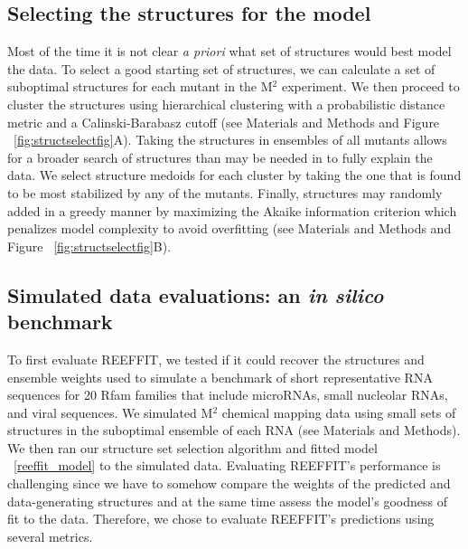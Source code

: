 \documentclass[12pt]{article}
\begin{document}
\subsection{Selecting the structures for the model}
Most of the time it is not clear \textit{a priori} what set of structures would best model the data. To select a good starting set of structures, we can calculate a set of suboptimal structures for each mutant in the M$^2$ experiment. We then proceed to cluster the structures using hierarchical clustering with a probabilistic distance metric and a Calinski-Barabasz cutoff (see Materials and Methods and Figure ~\ref{fig:structselectfig}A). Taking the structures in ensembles of all mutants allows for a broader search of structures than may be needed in to fully explain the data. We select structure medoids for each cluster by taking the one that is found to be most stabilized by any of the mutants. Finally, structures may randomly added in a greedy manner by maximizing the Akaike information criterion which penalizes model complexity to avoid overfitting \cite{Akaike1987} (see Materials and Methods and Figure ~\ref{fig:structselectfig}B).


\subsection{Simulated data evaluations: an \textit{in silico} benchmark}
To first evaluate REEFFIT, we tested if it could recover the structures and ensemble weights used to simulate a benchmark of short representative RNA sequences for 20 Rfam families \cite{Gardner2011} that include microRNAs, small nucleolar RNAs, and viral sequences. We simulated M$^2$ chemical mapping data using small sets of structures in the suboptimal ensemble of each RNA (see Materials and Methods). We then ran our structure set selection algorithm and fitted model ~\ref{reeffit_model} to the simulated data. Evaluating REEFFIT's performance is challenging since we have to somehow compare the weights of the predicted and data-generating structures and at the same time assess the model's goodness of fit to the data. Therefore, we chose to evaluate REEFFIT's predictions using several metrics. 
\end{document}
